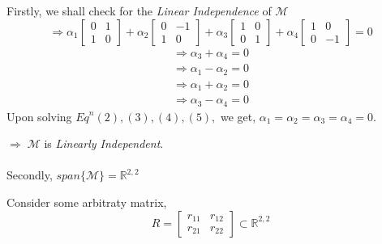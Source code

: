 \documentclass[a4paper]{article}
\begin{document}
\begin{qalist}
			Firstly, we shall check for the \textit{Linear Independence} of $\mathcal{M}$
			\begin{equation}
				\Rightarrow {\alpha}_{1}\begin{bmatrix}0 & 1 \\ 1 & 0\end{bmatrix} + {\alpha}_{2}\begin{bmatrix}0 & -1 \\ 1 & 0\end{bmatrix} + {\alpha}_{3}\begin{bmatrix}1 & 0 \\ 0 & 1\end{bmatrix} + {\alpha}_{4}\begin{bmatrix}1 & 0 \\ 0 & -1\end{bmatrix} = 0
			\end{equation}
			\begin{align}
				\Rightarrow {\alpha}_{3} + {\alpha}_{4} = 0 \\
				\Rightarrow {\alpha}_{1} - {\alpha}_{2} = 0 \\
				\Rightarrow {\alpha}_{1} + {\alpha}_{2} = 0 \\
				\Rightarrow {\alpha}_{3} - {\alpha}_{4} = 0
			\end{align}
			Upon solving ${Eq}^{n} (2), (3), (4), (5), $ we get, ${\alpha}_{1} = {\alpha}_{2} = {\alpha}_{3} = {\alpha}_{4} = 0.$
			
			$\Rightarrow \; \mathcal{M}$ is \textit{Linearly Independent}. \\ \\
			
			Secondly, $span\{\mathcal{M}\} = {\mathbb{R}}^{2,2}$ 
			
			Consider some arbitraty matrix, 
			\begin{equation}R = \begin{bmatrix}{r}_{11} & {r}_{12} \\ {r}_{21} & {r}_{22} \end{bmatrix} \subset {\mathbb{R}}^{2,2}\end{equation}
			

\end{qalist}
\end{document}
